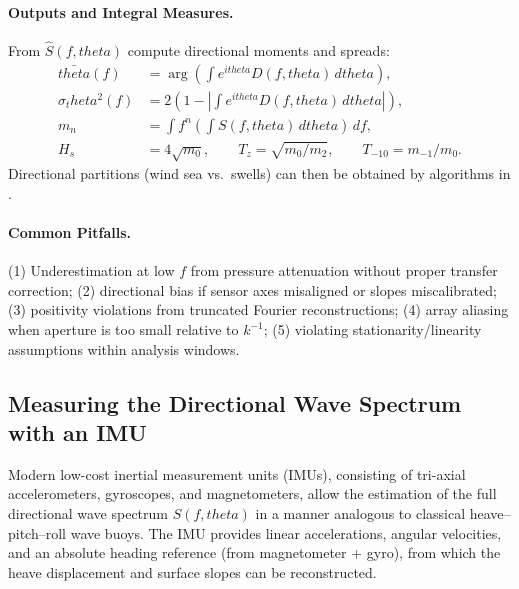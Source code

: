 \documentclass[journal,10pt,twocolumn]{IEEEtran}
\def\theta{theta}%
\def\mathrm#1{#1}%
\begin{document}
    \paragraph{Outputs and Integral Measures.}
    From $\widehat{S}(f,\theta)$ compute directional moments and spreads:
    \begin{align}
    \bar{\theta}(f)
    &= \arg\!\left(
       \int e^{\mathrm{i}\theta} D(f,\theta)\, d\theta
       \right),
    \\
    \sigma_\theta^2(f)
    &= 2\left(
       1-\left|
       \int e^{\mathrm{i}\theta} D(f,\theta)\, d\theta
       \right|
       \right),
    \\
    m_n
    &= \int f^n
       \left(
       \int S(f,\theta)\, d\theta
       \right)\, df,
    \\
    H_s &= 4\sqrt{m_0},
    \qquad
    T_z = \sqrt{m_0/m_2},
    \qquad
    T_{-10} = m_{-1}/m_0.
    \end{align}
    Directional partitions (wind sea vs.\ swells) can then be obtained by algorithms in .

    \paragraph{Common Pitfalls.}
    (1) Underestimation at low $f$ from pressure attenuation without proper transfer correction; (2) directional bias if sensor axes misaligned or slopes miscalibrated; (3) positivity violations from truncated Fourier reconstructions; (4) array aliasing when aperture is too small relative to $k^{-1}$; (5) violating stationarity/linearity assumptions within analysis windows.

    \subsection{Measuring the Directional Wave Spectrum with an IMU}
    \label{subsec:imu-directional-spectrum}

    Modern low-cost inertial measurement units (IMUs), consisting of tri-axial accelerometers, gyroscopes, and magnetometers, allow the estimation of the full directional wave spectrum $S(f,\theta)$ in a manner analogous to classical heave--pitch--roll wave buoys. The IMU provides linear accelerations, angular velocities, and an absolute heading reference (from magnetometer + gyro), from which the heave displacement and surface slopes can be reconstructed.
\end{document}
